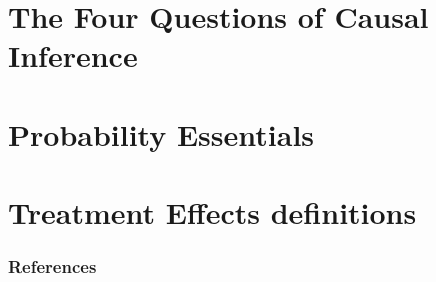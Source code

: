 \documentclass[xcolor=svgnames,t]{beamer}
\begin{document}
\section{The Four Questions of Causal Inference}
\section{Probability Essentials}
\section{Treatment Effects definitions}
\begin{frame} [allowframebreaks]
    \frametitle{References}
    
    
\end{frame}
\end{document}
